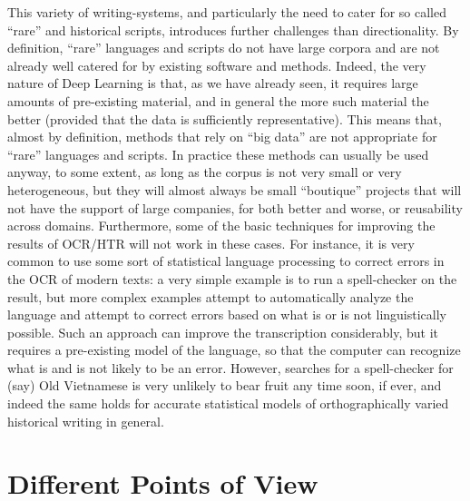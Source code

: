 This variety of writing-systems, and particularly the need to cater for so
called “rare” and historical scripts, introduces further challenges than
directionality. By definition, “rare” languages and scripts do not have large
corpora and are not already well catered for by existing software and methods.
Indeed, the very nature of Deep Learning is that, as we have already seen, it
requires large amounts of pre-existing material, and in general the more such
material the better (provided that the data is sufficiently representative).
This means that, almost by definition, methods that rely on “big data” are not
appropriate for “rare” languages and scripts. In practice these methods can
usually be used anyway, to some extent, as long as the corpus is not very small
or very heterogeneous, but they will almost always be small “boutique” projects
that will not have the support of large companies, for both better and worse,
or reusability across domains. Furthermore, some of the basic techniques for
improving the results of OCR/HTR will not work in these cases. For instance, it
is very common to use some sort of statistical language processing to correct
errors in the OCR of modern texts: a very simple example is to run a
spell-checker on the result, but more complex examples attempt to automatically
analyze the language and attempt to correct errors based on what is or is not
linguistically possible. Such an approach can improve the transcription
considerably, but it requires a pre-existing model of the language, so that the
computer can recognize what is and is not likely to be an error. However,
searches for a spell-checker for (say) Old Vietnamese is very unlikely to bear
fruit any time soon, if ever, and indeed the same holds for accurate
statistical models of orthographically varied historical writing in general.

\section{Different Points of View}

